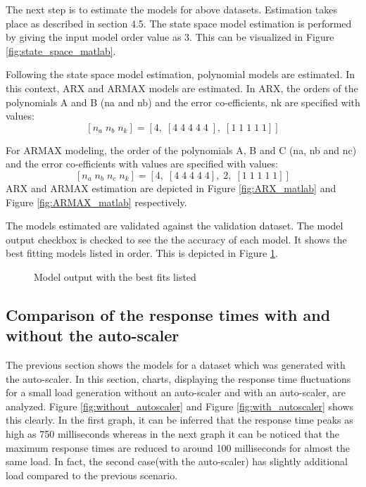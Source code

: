 \documentclass[article,type=msc,colorback,12pt,accentcolor=tud8b,table]{tudthesis}
\begin{document}
	The next step is to estimate the models for above datasets. Estimation takes place as described in section 4.5. The state space model estimation is performed by giving the input model order value as 3. This can be visualized in Figure \ref{fig:state_space_matlab}.
	
	Following the state space model estimation, polynomial models are estimated. In this context, ARX and ARMAX models are estimated. In ARX, the orders of the polynomials A and B (na and nb) and the error co-efficients, nk are specified with values: $$ [n_a\;n_b \;n_k] = [ 4,\; [ 4\; 4\; 4\; 4\; 4\; ],\; [ 1 \;1 \;1 \;1 \;1 ] ]$$
	
	For ARMAX modeling, the order of the polynomials A, B and C (na, nb and nc) and the error co-efficients with values are specified with values: $$ [n_a\; n_b\; n_c\; n_k] = [ 4,\; [ 4\; 4\; 4\; 4\; 4 ], \;2,\; [ 1\; 1\; 1\; 1\; 1 ] ]$$ ARX and ARMAX estimation are depicted in Figure \ref{fig:ARX_matlab} and Figure \ref{fig:ARMAX_matlab} respectively.

	The models estimated are validated against the validation dataset. The model output checkbox is checked to see the the accuracy of each model. It shows the best fitting models listed in order. This is depicted in Figure \ref{fig:model_output}.
   \begin{figure}[H]
		    	\begin{center}
		    		\makebox[\textwidth]{\texttt{[image: E14]}}
		    	\end{center}
		    	\caption{Model output with the best fits listed}
		    		\label{fig:model_output}
   \end{figure}
\subsection{Comparison of the response times with and without the auto-scaler}
The previous section shows the models for a dataset which was generated with the auto-scaler. In this section, charts, displaying the response time fluctuations for a small load generation without an auto-scaler and with an auto-scaler, are analyzed. Figure \ref{fig:without_autoscaler} and Figure \ref{fig:with_autoscaler} shows this clearly. In the first graph, it can be inferred that the response time peaks as high as 750 milliseconds whereas in the next graph it can be noticed that the maximum response times are reduced to around 100 milliseconds for almost the same load. In fact, the second case(with the auto-scaler) has slightly additional load compared to the previous scenario.
\end{document}
